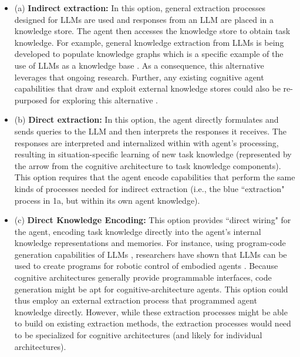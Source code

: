 \documentclass[letterpaper]{article} %
\begin{document}
\begin{itemize}

\item (a) \textbf{Indirect extraction:} In this option,  general extraction processes designed for LLMs are used and responses from an LLM are placed in a knowledge store. The agent then accesses the knowledge store to obtain task knowledge. For example, general knowledge extraction from LLMs is being developed to populate knowledge graphs \cite{bosselut_comet_2019} which is a specific example of the use of LLMs as a knowledge base \cite{petroni_language_2019}. As a consequence, this alternative leverages that ongoing research. Further, any existing cognitive agent capabilities that draw and exploit external knowledge stores could also be re-purposed for exploring this alternative \cite{wray_language_2021}.
\item (b) \textbf{Direct extraction:} In this option, the agent directly formulates and sends queries to the LLM and then interprets the responses it receives. The responses are interpreted and internalized within with agent's processing, resulting in situation-specific learning of new task knowledge (represented by the arrow from the cognitive architecture to task knowledge components). This option requires that the agent encode capabilities that perform the same kinds of processes needed for indirect extraction (i.e., the blue ``extraction" process in 1a, but within its own agent knowledge).
\item (c) \textbf{Direct Knowledge Encoding:} This option provides ``direct wiring" for the agent,  encoding task knowledge directly into the agent's internal knowledge representations and memories. For instance, using program-code generation capabilities of LLMs \cite{chen_evaluating_2021,austin_program_2021}, researchers have shown that LLMs can be used to create programs for robotic control of embodied agents \cite{singh_progprompt_2023,brohan_rt-2_2023}. Because cognitive architectures generally provide programmable interfaces, code generation might be apt for cognitive-architecture agents. This option could thus employ an external extraction process that programmed agent knowledge directly. However, while these extraction processes might be able to build on existing extraction methods, the extraction processes would need to be specialized for cognitive architectures (and likely for individual architectures).

\end{itemize}
\end{document}
